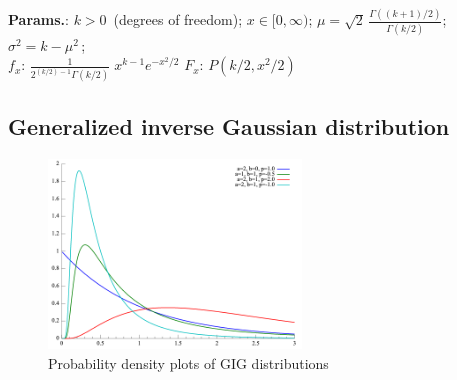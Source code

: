     {\color{darkblue} \textbf{Params.}:} {$k>0\,$ (degrees of freedom)}; {$x\in [0,\infty)$}; {$\mu=\sqrt{2}\,\frac{\Gamma((k+1)/2)}{\Gamma(k/2)}$}; {$\sigma^2=k-\mu^2\,$};\hspace{0.5cm}\\{\color{darkblue} \textbf{$f_x$}:} {$\frac{1}{2^{(k/2)-1}\Gamma(k/2)}\;x^{k-1}e^{-x^2/2}$}{\color{darkblue} \textbf{$F_x$}:} {$P(k/2,x^2/2)\,$}



    
        
\subsection{Generalized inverse Gaussian distribution}


    \begin{figure}[H]
        \centering
        \includegraphics[width=0.6\textwidth]{images/GIG distribution pdf.png}
        \caption{Probability density plots of GIG distributions}
    \end{figure}




